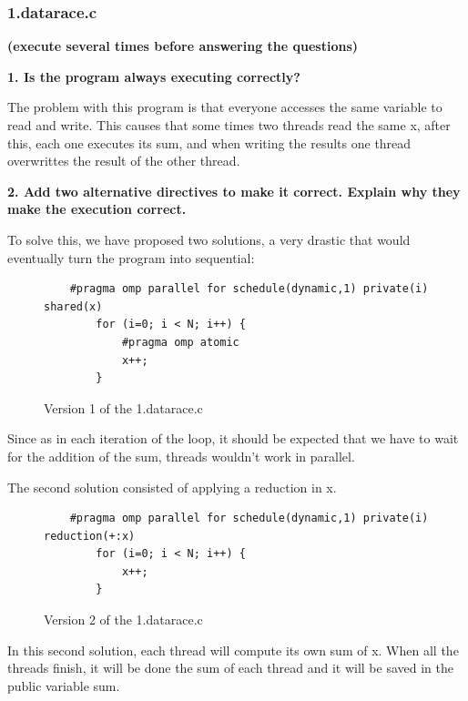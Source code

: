 \documentclass[12pt, a4paper]{article}
\begin{document}
\subsubsection{1.datarace.c}

\textbf{(execute several times before answering the questions)}

\hfill

\textbf{1. Is the program always executing correctly?}

\hfill

The problem with this program is that everyone accesses the same variable to read and write.
This causes that some times two threads read the same x, after this, each one executes its sum, and when writing the results one thread overwrittes the result of the other thread.

\hfill

\textbf{2. Add two alternative directives to make it correct. Explain why they make the execution
correct.}

\hfill

To solve this, we have proposed two solutions, a very drastic that would eventually turn the program into sequential:

\begin{figure}[H]
	\begin{lstlisting}
	#pragma omp parallel for schedule(dynamic,1) private(i) shared(x)
		for (i=0; i < N; i++) {
			#pragma omp atomic
			x++;
		}
	\end{lstlisting}
	
	\caption{Version 1 of the 1.datarace.c}
\end{figure}

Since as in each iteration of the loop, it should be expected that we have to wait for the addition of the sum, threads wouldn't work in parallel.

The second solution consisted of applying a reduction in x.

\begin{figure}[H]
	\begin{lstlisting}
	#pragma omp parallel for schedule(dynamic,1) private(i) reduction(+:x)
		for (i=0; i < N; i++) {
			x++;
		}
	\end{lstlisting}
	
	\caption{Version 2 of the 1.datarace.c}
\end{figure}

In this second solution, each thread will compute its own sum of x.
When all the threads finish, it will be done the sum of each thread and it will be saved in the public variable sum.
\end{document}
